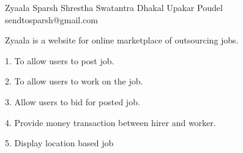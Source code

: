  \begin{conf-abstract}[]
 {Zyaala}
 {Sparsh Shrestha
 	 Swatantra Dhakal
 	  Upakar Poudel
 }
{sendtosparsh@gmail.com}

Zyaala is a website for online marketplace of outsourcing jobs.

1.	To allow users to post job.

2.	To allow users to work on the job.

3.	Allow users to bid for posted job.

4.	Provide money transaction between hirer and worker.

5.	Display location based job
 \end{conf-abstract}